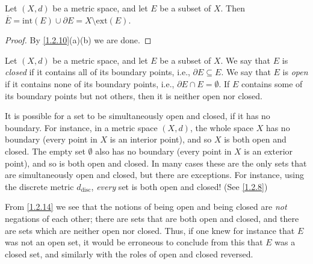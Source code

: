 \begin{corollary}\label{1.2.11}
  Let \((X, d)\) be a metric space, and let \(E\) be a subset of \(X\).
  Then \(\overline{E} = \text{int}(E) \cup \partial E = X \setminus \text{ext}(E)\).
\end{corollary}

\begin{proof}
  By \cref{1.2.10}(a)(b) we are done.
\end{proof}

\begin{definition}\label{1.2.12}
  Let \((X, d)\) be a metric space, and let \(E\) be a subset of \(X\).
  We say that \(E\) is \emph{closed} if it contains all of its boundary points, i.e., \(\partial E \subseteq E\).
  We say that \(E\) is \emph{open} if it contains none of its boundary points, i.e., \(\partial E \cap E = \emptyset\).
  If \(E\) contains some of its boundary points but not others, then it is neither open nor closed.
\end{definition}

\setcounter{theorem}{13}
\begin{remark}\label{1.2.14}
  It is possible for a set to be simultaneously open and closed, if it has no boundary.
  For instance, in a metric space \((X, d)\), the whole space \(X\) has no boundary (every point in \(X\) is an interior point), and so \(X\) is both open and closed.
  The empty set \(\emptyset\) also has no boundary (every point in \(X\) is an exterior point), and so is both open and closed.
  In many cases these are the only sets that are simultaneously open and closed, but there are exceptions.
  For instance, using the discrete metric \(d_{\text{disc}}\), \emph{every} set is both open and closed! (See \cref{1.2.8})
\end{remark}

\begin{note}
  From \cref{1.2.14} we see that the notions of being open and being closed are \emph{not} negations of each other;
  there are sets that are both open and closed, and there are sets which are neither open nor closed.
  Thus, if one knew for instance that \(E\) was not an open set, it would be erroneous to conclude from this that \(E\) was a closed set, and similarly with the roles of open and closed reversed.
\end{note}

